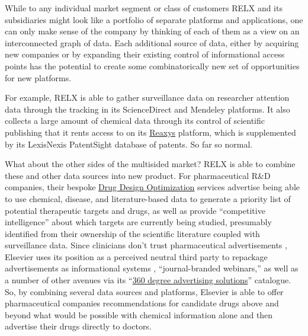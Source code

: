 While to any individual market segment or class of customers RELX and
its subsidiaries might look like a portfolio of separate platforms and
applications, one can only make sense of the company by thinking of each
of them as a view on an interconnected graph of data. Each additional source of data, either by acquiring new
companies or by expanding their existing control of informational access
points has the potential to create some combinatorically new set of
opportunities for new platforms.

For example, RELX is able to gather surveillance data on researcher
attention data through the tracking in its ScienceDirect and Mendeley
platforms. It also collects a large amount of chemical data through its
control of scientific publishing that it rents access to on its
\href{https://www.elsevier.com/en-gb/solutions/reaxys}{Reaxys} platform,
which is supplemented by its LexisNexis PatentSight database of patents.
So far so normal.

What about the other sides of the multisided market? RELX is able to
combine these and other data sources into new product. For
pharmaceutical R\&D companies, their bespoke
\href{https://web.archive.org/web/20211207070524/https://www.elsevier.com/solutions/professional-services/drug-design-optimization}{Drug
Design Optimization} services advertise being able to use chemical,
disease, and literature-based data to generate a priority list of
potential therapeutic targets and drugs, as well as provide
``competitive intelligence'' about which targets are currently being
studied, presumably identified from their ownership of the scientific
literature coupled with surveillance data. Since clinicians don't trust
pharmaceutical advertisements \cite{elsevierMakingMedicalInformation2021} , Elsevier uses its position as
a perceived neutral third party to repackage advertisements as
informational systems \cite{elsevierRethinkClincalContent2020} ,
``journal-branded webinars,'' as well as a number of other avenues via
its
``\href{https://web.archive.org/web/20211111211058/https://www.elsevier.com/advertising-reprints-supplements/advertising}{360
degree advertising solutions}'' catalogue. So, by combining several data
sources and platforms, Elsevier is able to offer pharmaceutical
companies recommendations for candidate drugs above and beyond what
would be possible with chemical information alone and then advertise
their drugs directly to doctors.

